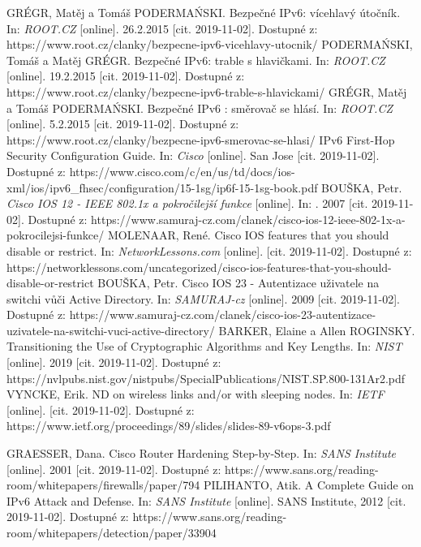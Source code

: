 \begin{literatura}{99}
GRÉGR, Matěj a Tomáš PODERMAŃSKI. Bezpečné IPv6: vícehlavý útočník. In: \textit{ROOT.CZ} [online]. 26.2.2015 [cit. 2019-11-02]. Dostupné z: https://www.root.cz/clanky/bezpecne-ipv6-vicehlavy-utocnik/
PODERMAŃSKI, Tomáš a Matěj GRÉGR. Bezpečné IPv6: trable s hlavičkami. In: \textit{ROOT.CZ} [online]. 19.2.2015 [cit. 2019-11-02]. Dostupné z: https://www.root.cz/clanky/bezpecne-ipv6-trable-s-hlavickami/
GRÉGR, Matěj a Tomáš PODERMAŃSKI. Bezpečné IPv6 : směrovač se hlásí. In: \textit{ROOT.CZ} [online]. 5.2.2015 [cit. 2019-11-02]. Dostupné z: https://www.root.cz/clanky/bezpecne-ipv6-smerovac-se-hlasi/
IPv6 First-Hop Security Configuration Guide. In: \textit{Cisco} [online]. San Jose [cit. 2019-11-02]. Dostupné z: https://www.cisco.com/c/en/us/td/docs/ios-xml/ios/ipv6\_fhsec/configuration/15-1sg/ip6f-15-1sg-book.pdf
BOUŠKA, Petr. \textit{Cisco IOS 12 - IEEE 802.1x a pokročilejší funkce} [online]. In: . 2007 [cit. 2019-11-02]. Dostupné z: https://www.samuraj-cz.com/clanek/cisco-ios-12-ieee-802-1x-a-pokrocilejsi-funkce/
MOLENAAR, René. Cisco IOS features that you should disable or restrict. In: \textit{NetworkLessons.com} [online]. [cit. 2019-11-02]. Dostupné z: https://networklessons.com/uncategorized/cisco-ios-features-that-you-should-disable-or-restrict
BOUŠKA, Petr. Cisco IOS 23 - Autentizace uživatele na switchi vůči Active Directory. In: \textit{SAMURAJ-cz} [online]. 2009 [cit. 2019-11-02]. Dostupné z: https://www.samuraj-cz.com/clanek/cisco-ios-23-autentizace-uzivatele-na-switchi-vuci-active-directory/
BARKER, Elaine a Allen ROGINSKY. Transitioning the Use of Cryptographic Algorithms and Key Lengths. In: \textit{NIST} [online]. 2019 [cit. 2019-11-02]. Dostupné z: https://nvlpubs.nist.gov/nistpubs/SpecialPublications/NIST.SP.800-131Ar2.pdf
VYNCKE, Erik. ND on wireless links and/or with sleeping nodes. In: \textit{IETF} [online]. [cit. 2019-11-02]. Dostupné z: https://www.ietf.org/proceedings/89/slides/slides-89-v6ops-3.pdf


GRAESSER, Dana. Cisco Router Hardening Step-by-Step. In: \textit{SANS Institute} [online]. 2001 [cit. 2019-11-02]. Dostupné z: https://www.sans.org/reading-room/whitepapers/firewalls/paper/794
PILIHANTO, Atik. A Complete Guide on IPv6 Attack and Defense. In: \textit{SANS Institute} [online]. SANS Institute, 2012 [cit. 2019-11-02]. Dostupné z: https://www.sans.org/reading-room/whitepapers/detection/paper/33904


\end{literatura}
